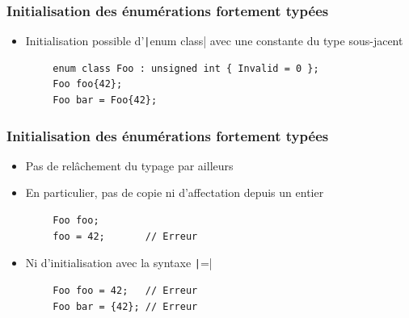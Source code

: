 \documentclass[C++.tex]{subfiles}
\begin{document}
\begin{frame}[fragile]
	\frametitle{Initialisation des énumérations fortement typées}
	\begin{itemize}
		\item Initialisation possible d'\texttt|enum class| avec une constante du type sous-jacent
	\end{itemize}

	\begin{verbatim}
		enum class Foo : unsigned int { Invalid = 0 };
		Foo foo{42};
		Foo bar = Foo{42};
	\end{verbatim}
\end{frame}

\begin{frame}[fragile]
	\frametitle{Initialisation des énumérations fortement typées}
	\begin{itemize}
		\item Pas de relâchement du typage par ailleurs
		\item En particulier, pas de copie ni d'affectation depuis un entier
	\end{itemize}

	\begin{verbatim}
		Foo foo;
		foo = 42;       // Erreur
	\end{verbatim}

	\begin{itemize}
		\item Ni d'initialisation avec la syntaxe \texttt|=|
	\end{itemize}

	\begin{verbatim}
		Foo foo = 42;   // Erreur
		Foo bar = {42}; // Erreur
	\end{verbatim}


\end{frame}
\end{document}

